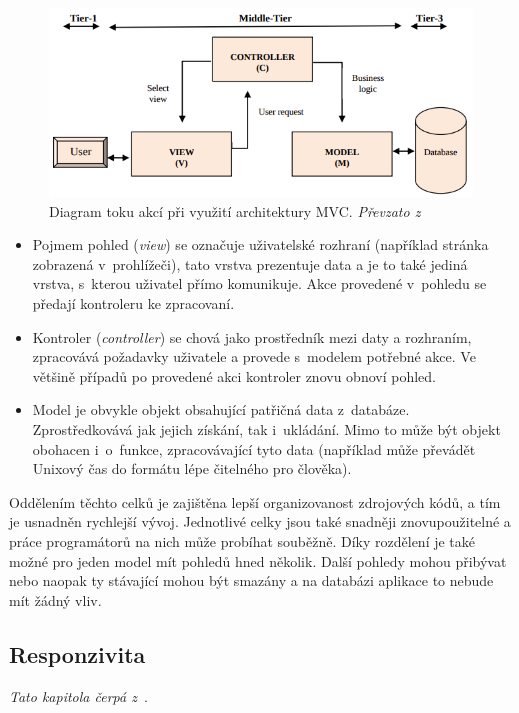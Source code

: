 \begin{figure}[H]
	\centering
	\includegraphics[width=\textwidth]{obrazky-figures/mvc.png}
	\caption{Diagram toku akcí při využití architektury MVC. \emph{Převzato z~\cite{bib:mvc}}}
	\label{img:mvc}
\end{figure}

\begin{itemize}
\item Pojmem pohled (\emph{view}) se označuje uživatelské rozhraní (například stránka zobrazená v~prohlížeči), tato vrstva prezentuje data a je to také jediná vrstva, s~kterou uživatel přímo komunikuje. Akce provedené v~pohledu se předají kontroleru ke zpracovaní.
\item Kontroler (\emph{controller}) se chová jako prostředník mezi daty a rozhraním, zpracovává požadavky uživatele a provede s~modelem potřebné akce. Ve většině případů po provedené akci kontroler znovu obnoví pohled.
\item Model je obvykle objekt obsahující patřičná data z~databáze. Zprostředkovává jak jejich získání, tak i~ukládání. Mimo to může být objekt obohacen i~o~funkce, zpracovávající tyto data (například může převádět Unixový čas do formátu lépe čitelného pro člověka). 
\end{itemize}


Oddělením těchto celků je zajištěna lepší organizovanost zdrojových kódů, a tím je usnadněn rychlejší vývoj. Jednotlivé celky jsou také snadněji znovupoužitelné a práce programátorů na nich může probíhat souběžně. Díky rozdělení je také možné pro jeden model mít pohledů hned několik. Další pohledy mohou přibývat nebo naopak ty stávající mohou být smazány a na databázi aplikace to nebude mít žádný vliv.


\subsection{Responzivita}\label{section:responsive}
\emph{Tato kapitola čerpá z~\cite{bib:responsive}}.

